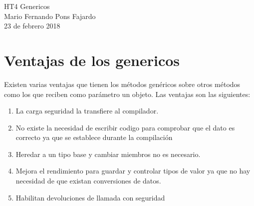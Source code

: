 \documentclass[10pt,a4paper]{article}
\begin{document}
\begin{center}
\huge {HT4 Genericos} \\
\large {Mario Fernando Pons Fajardo} \\
\large {23 de febrero 2018}

\end{center}

\section*{Ventajas de los genericos}
Existen varias ventajas que tienen los métodos genéricos sobre otros métodos como los que reciben como parámetro un objeto. Las ventajas son las siguientes:

\begin{enumerate}
			\item{La carga seguridad la transfiere al compilador.  }
			\item{No existe la necesidad de escribir codigo para comprobar que el dato es correcto ya que se establece durante la compilación}
			\item{Heredar a un tipo base y cambiar miembros no es necesario.}

			\item{Mejora el rendimiento para guardar y controlar tipos de valor ya que no hay necesidad de que existan conversiones de datos.}

			\item{Habilitan devoluciones de llamada con seguridad}


\end{enumerate} 
 
\end{document}
